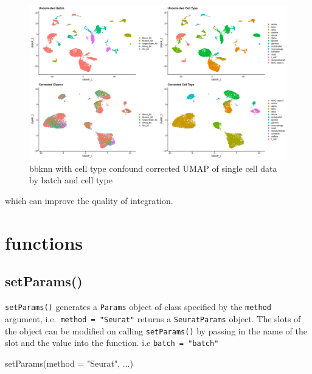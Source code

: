 \documentclass[
]{book}
\newenvironment{Shaded}{\begin{snugshade}}{\end{snugshade}}
\newcommand{\AttributeTok}[1]{\textcolor[rgb]{0.77,0.63,0.00}{#1}}
\newcommand{\FunctionTok}[1]{\textcolor[rgb]{0.00,0.00,0.00}{#1}}
\newcommand{\NormalTok}[1]{#1}
\newcommand{\StringTok}[1]{\textcolor[rgb]{0.31,0.60,0.02}{#1}}
\begin{document}
\begin{figure}

{\centering \includegraphics[width=33.33in,height=0.8\textheight]{_book/ensemblemerge_files/images/bbknn_cell_type_confound} 

}

\caption{bbknn with cell type confound corrected UMAP of single cell data by batch and cell type}\label{fig:unnamed-chunk-26}
\end{figure}

which can improve the quality of integration.

\hypertarget{functions}{%
\chapter{functions}\label{functions}}

\hypertarget{setparams}{%
\section{setParams()}\label{setparams}}

\texttt{setParams()} generates a \texttt{Params} object of class specified by the \texttt{method} argument, i.e.~\texttt{method\ =\ "Seurat"} returns a \texttt{SeuratParams} object. The slots of the object can be modified on calling \texttt{setParams()} by passing in the name of the slot and the value into the function. i.e \texttt{batch\ =\ "batch"}

\begin{Shaded}
\begin{Highlighting}[]
\FunctionTok{setParams}\NormalTok{(}\AttributeTok{method =} \StringTok{"Seurat"}\NormalTok{, ...)}
\end{Highlighting}
\end{Shaded}
\end{document}
